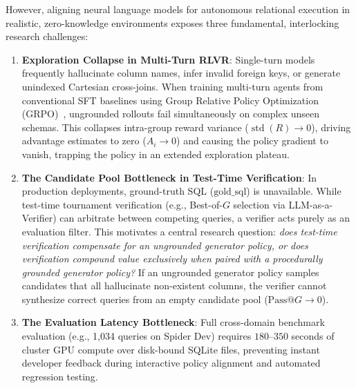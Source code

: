 \documentclass{article}
\theoremstyle{plain}
\theoremstyle{definition}
\theoremstyle{remark}
\begin{document}
However, aligning neural language models for autonomous relational execution in realistic, zero-knowledge environments exposes three fundamental, interlocking research challenges:
\begin{enumerate}[leftmargin=*,itemsep=1pt,topsep=2pt]
    \item \textbf{Exploration Collapse in Multi-Turn RLVR}: Single-turn models frequently hallucinate column names, infer invalid foreign keys, or generate unindexed Cartesian cross-joins. When training multi-turn agents from conventional SFT baselines using Group Relative Policy Optimization (GRPO)~\citep{shao2024deepseekmath}, ungrounded rollouts fail simultaneously on complex unseen schemas. This collapses intra-group reward variance ($\operatorname{std}(R) \to 0$), driving advantage estimates to zero ($A_i \to 0$) and causing the policy gradient to vanish, trapping the policy in an extended exploration plateau.
    \item \textbf{The Candidate Pool Bottleneck in Test-Time Verification}: In production deployments, ground-truth SQL ($\text{gold\_sql}$) is unavailable. While test-time tournament verification (e.g., Best-of-$G$ selection via LLM-as-a-Verifier) can arbitrate between competing queries, a verifier acts purely as an evaluation filter. This motivates a central research question: \emph{does test-time verification compensate for an ungrounded generator policy, or does verification compound value exclusively when paired with a procedurally grounded generator policy?} If an ungrounded generator policy samples candidates that all hallucinate non-existent columns, the verifier cannot synthesize correct queries from an empty candidate pool ($\text{Pass@}G \to 0$).
    \item \textbf{The Evaluation Latency Bottleneck}: Full cross-domain benchmark evaluation (e.g., 1,034 queries on Spider Dev) requires $180$--$350$ seconds of cluster GPU compute over disk-bound SQLite files, preventing instant developer feedback during interactive policy alignment and automated regression testing.
\end{enumerate}
\end{document}
